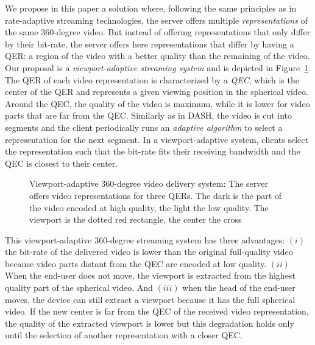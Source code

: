 We propose in this paper a solution where, following the same
principles as in rate-adaptive streaming technologies, the server
offers multiple \emph{representations} of the same $360$-degree video.
But instead of offering representations that only differ by their
bit-rate, the server offers here representations that differ by having
a \ac{QER}: a region of the video with a better quality than the remaining
of the video.
Our proposal is a
\emph{viewport-adaptive streaming system} and is depicted in
Figure~\ref{fig:deliverychain}. The \ac{QER} of each video representation is characterized
by a \emph{\ac{QEC}}, which is the center of the \ac{QER} and represents a given viewing position in the
spherical video. Around the \ac{QEC}, the quality of the video is
maximum, while it is lower for video parts that are far from the
\ac{QEC}. Similarly as in \ac{DASH}, the video is cut into segments
and the client periodically runs an \emph{adaptive algorithm} to
select a representation for the next segment. In a
viewport-adaptive system, clients select the representation
such that the bit-rate fits their receiving
bandwidth and the \ac{QEC} is closest to their \FoV{} center.

\begin{figure}
   \centering
   
   \caption{Viewport-adaptive 360-degree video delivery system: The server
   offers video representations for three \acp{QER}. The dark  is the part of the video encoded at high quality, the light
    the low quality. The viewport is the dotted red rectangle, the \FoV{} center the
   cross}
   \label{fig:deliverychain}
\end{figure}

This viewport-adaptive $360$-degree streaming system has three
advantages: $(i)$ the bit-rate of the delivered video is lower than
the original full-quality video because video parts distant from the
\ac{QEC} are encoded at low quality. $(ii)$ When the end-user does not
move, the viewport is extracted from the highest quality part of the
spherical video. And $(iii)$ when the head of the end-user moves, the
device can still extract a viewport because it has the full
spherical video. If the new \FoV{} center is far from the \ac{QEC}
of the received video representation, the quality of the
extracted viewport is lower but this degradation holds only until the
selection of another representation with a closer \ac{QEC}.

